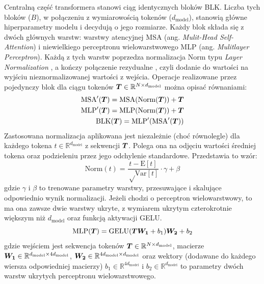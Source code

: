 Centralną część transformera stanowi ciąg identycznych bloków BLK. Liczba tych bloków ($B$), w
połączeniu z wymiarowością tokenów ($d_{\mathrm{model}}$), stanowią główne hiperparametry modelu i
decydują o jego rozmiarze. Każdy blok składa się z dwóch głównych warstw: warstwy atencyjnej MSA
(ang. \emph{Mulit-Head Self-Attention}) i niewielkiego perceptronu wielowarstwowego MLP (ang.
\emph{Mulitlayer Perceptron}). Każdą z tych warstw poprzedza normalizacja Norm typu \emph{Layer
Normalization} \cite{ba_layer_2016}, a kończy połączenie rezydualne \cite{he_deep_2015}, czyli
dodanie do wartości na wyjściu nieznormalizowanej wartości z wejścia. Operacje realizowane przez
pojedynczy blok dla ciągu tokenów $\boldsymbol{T} \in \mathbb{R}^{N \times d_{\mathrm{model}}}$ można opisać równaniami:
\begin{eqnarray}
     \textrm{MSA}'(\boldsymbol{T}) = \textrm{MSA}(\textrm{Norm}(\boldsymbol{T})) + \boldsymbol{T} \\
     \textrm{MLP}'(\boldsymbol{T}) = \textrm{MLP}(\textrm{Norm}(\boldsymbol{T})) + \boldsymbol{T} \\
     \textrm{BLK}(\boldsymbol{T}) = \textrm{MLP}'(\textrm{MSA}'(\boldsymbol{T}))
\end{eqnarray}
Zastosowana normalizacja aplikowana jest niezależnie (choć równolegle) dla każdego tokena $t \in
\mathbb{R}^{d_{\mathrm{model}}}$ z sekwencji $\boldsymbol{T}$. Polega ona na odjęciu wartości średniej
tokena oraz podzieleniu przez jego odchylenie standardowe. Przedstawia to wzór:
\begin{equation}
    \textrm{Norm}(t) = \frac{t - \textrm{E}[t]}{\sqrt \textrm{Var}[t]} \cdot \gamma + \beta
\end{equation}
gdzie $\gamma$ i $\beta$ to trenowane parametry warstwy, przesuwające i skalujące odpowiednio wynik
normalizacji. Jeżeli chodzi o perceptron wielowarstwowy, to ma ona zawsze dwie warstwy ukryte, z
wymiarem ukrytym czterokrotnie większym niż $d_{\mathrm{model}}$ oraz funkcją aktywacji GELU.
\begin{equation}
    \textrm{MLP}(\boldsymbol{T}) = \textrm{GELU}(\boldsymbol{T}\boldsymbol{W_1} + b_1)\boldsymbol{W_2} + b_2
\end{equation}
gdzie wejściem jest sekwencja tokenów $\boldsymbol{T} \in \mathbb{R}^{N \times d_{\mathrm{model}}}$, macierze
$\boldsymbol{W_1} \in \mathbb{R}^{d_{\mathrm{model}} \times 4d_{\mathrm{model}}}$,
$\boldsymbol{W_2} \in \mathbb{R}^{4d_{\mathrm{model}} \times d_{\mathrm{model}}}$ oraz wektory (dodawane do każdego wiersza
odpowiedniej macierzy) $b_1 \in \mathbb{R}^{4d_{\mathrm{model}}}$ i $b_2 \in
\mathbb{R}^{d_{\mathrm{model}}}$ to parametry dwóch warstw ukrytych perceptronu wielowarstwowego.

